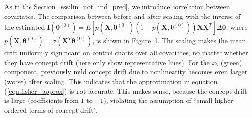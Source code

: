 \documentclass[twoside,11pt]{article}
\begin{document}
\begin{enumerate}[(I)]
\begin{figure}[!htbp]
{%
}
  \label{fig:log_reg_not_ind_X}
\end{figure}
As in the Section~\ref{sss:lin_not_ind_pred}, we introduce correlation between {covariates.} The comparison between before and after scaling with {the inverse of the estimated} {$\mathbf {I} ( {\bm{\theta}} ^{ (0)}) = E [{p} (\bm {X},\bm { \theta} ^{ (0)}) (1-{p}(\bm {X},\bm { \theta} ^{ (0)})) \bm {X} \bm {X}^T] \Delta \bm{ \theta}$}, where {$p (\bm {X},\bm { \theta} ^{ (0)}) = \sigma ( \bm {X}^T\bm { \theta} ^{ (0)})$}, is shown in Figure~\ref{fig:log_reg_not_ind_X}. The scaling makes the mean {drift} uniformly significant on control charts over all {covariates,} no matter whether they have concept drift (here only show representative lines). For the $x_7$ (green) component, previously mild concept drift due to nonlinearity becomes even larger (worse) after scaling. This indicates that the approximation in equation (\ref{eqn:fisher_approx}) is not accurate. This makes sense, because the concept drift is large (coefficients from $1$ to $-1$), violating the assumption of ``small higher-ordered terms of concept drift". 


\end{enumerate}
\end{document}
